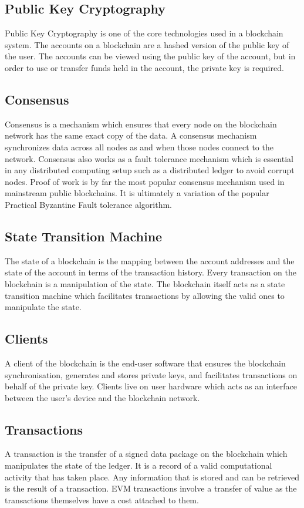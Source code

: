 \documentclass[a4paper,twoside,phd]{BYUPhys}
\begin{document}
\subsection{Public Key Cryptography}
Public Key Cryptography is one of the core technologies used in a blockchain system. The accounts on a blockchain are a hashed version of the public key of the user. The accounts can be viewed using the public key of the account, but in order to use or transfer funds held in the account, the private key is required.
\subsection{Consensus}
Consensus is a mechanism which ensures that every node on the blockchain network has the same exact copy of the data. A consensus mechanism synchronizes data across all nodes as and when those nodes connect to the network. Consensus also works as a fault tolerance mechanism which is essential in any distributed computing setup such as a distributed ledger to avoid corrupt nodes. Proof of work is by far the most popular consensus mechanism used in mainstream public blockchains. It is ultimately a variation of the popular Practical Byzantine Fault tolerance algorithm.
\subsection{State Transition Machine}
The state of a blockchain is the mapping between the account addresses and the state of the account in terms of the transaction history. Every transaction on the blockchain is a manipulation of the state. The blockchain itself acts as a state transition machine which facilitates transactions by allowing the valid ones to manipulate the state.
\subsection{Clients}
A client of the blockchain is the end-user software that ensures the blockchain synchronisation, generates and stores private keys, and facilitates transactions on behalf of the private key. Clients live on user hardware which acts as an interface between the user's device and the blockchain network.
\subsection{Transactions}
A transaction is the transfer of a signed data package on the blockchain which manipulates the state of the ledger. It is a record of a valid computational activity that has taken place. Any information that is stored and can be retrieved is the result of a transaction. EVM transactions involve a transfer of value as the transactions themselves have a cost attached to them. 
\end{document}

